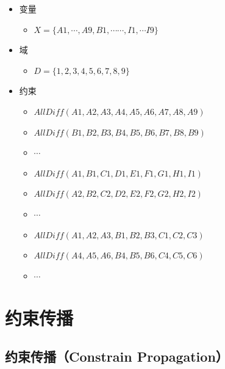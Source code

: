 \begin{itemize}
    \item 变量
          \begin{itemize}
              \item $ X = \{A1, \cdots, A9, B1, \cdots \cdots, I1, \cdots I9\} $
          \end{itemize}
    \item 域
          \begin{itemize}
              \item $ D = \{1, 2, 3, 4, 5, 6, 7, 8, 9\} $
          \end{itemize}
    \item 约束
          \begin{itemize}
              \item $ AllDiff(A1, A2, A3, A4, A5, A6, A7, A8, A9) $
              \item $ AllDiff(B1, B2, B3, B4, B5, B6, B7, B8, B9) $
              \item $ \cdots $
              \item $ AllDiff(A1, B1, C1, D1, E1, F1, G1, H1, I1) $
              \item $ AllDiff(A2, B2, C2, D2, E2, F2, G2, H2, I2) $
              \item $ \cdots $
              \item $ AllDiff(A1, A2, A3, B1, B2, B3, C1, C2, C3) $
              \item $ AllDiff(A4, A5, A6, B4, B5, B6, C4, C5, C6) $
              \item $ \cdots $
          \end{itemize}
\end{itemize}

\newpage

\section{约束传播}

\subsection{约束传播（Constrain Propagation）}

